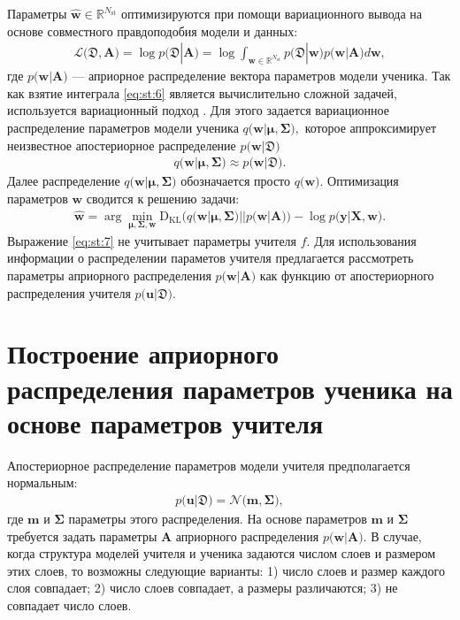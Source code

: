 Параметры $\hat{\mathbf{w}} \in \mathbb{R}^{N_{\text{st}}}$ оптимизируются при помощи вариационного вывода на основе совместного правдоподобия модели и данных:
\[
\label{eq:st:6}
\begin{aligned}
\mathcal{L}\bigr(\mathfrak{D}, \mathbf{A}\bigr) = \log p\bigr(\mathfrak{D}|\mathbf{A}\bigr) = \log \int_{\mathbf{w} \in \mathbb{R}^{N_{\text{st}}}}p\bigr(\mathfrak{D}|\mathbf{w}\bigr)p\bigr(\mathbf{w}|\mathbf{A}\bigr)d\mathbf{w},
\end{aligned}
\]
где $p\bigr(\mathbf{w}| \mathbf{A}\bigr)$ --- априорное распределение вектора параметров модели ученика.
Так как взятие интеграла \eqref{eq:st:6} является вычислительно сложной задачей, используется вариационный подход \cite{graves2011, grabovoy2019}. Для этого задается вариационное распределение параметров модели ученика $q\bigr(\mathbf{w}|\bm{\mu}, \bm{\Sigma}\bigr),$ которое аппроксимирует неизвестное апостериорное распределение $p\bigr(\mathbf{w}|\mathfrak{D}\bigr)$
\[
\label{eq:st:new:1}
\begin{aligned}
q\bigr(\mathbf{w}|\bm{\mu}, \bm{\Sigma}\bigr) \approx  p\bigr(\mathbf{w}|\mathfrak{D}\bigr).
\end{aligned}
\]
Далее распределение $q\bigr(\mathbf{w}|\bm{\mu}, \bm{\Sigma}\bigr)$ обозначается просто $q\bigr(\mathbf{w}\bigr).$ Оптимизация параметров $\mathbf{w}$ сводится к решению  задачи:
\[
\label{eq:st:7}
\begin{aligned}
\hat{\mathbf{w}} = \arg \min_{\bm{\mu}, \bm{\Sigma}, \mathbf{w}} \text{D}_{\text{KL}}\bigr(q\bigr(\mathbf{w}|\bm{\mu}, \bm{\Sigma}\bigr)||p\bigr(\mathbf{w}|\mathbf{A}\bigr)\bigr) - \log p\bigr(\mathbf{y}|\mathbf{X}, \mathbf{w}\bigr).
\end{aligned}
\]
Выражение \eqref{eq:st:7} не учитывает параметры учителя $f$. Для использования информации о распределении параметов учителя предлагается рассмотреть параметры априорного распределения $p\bigr(\mathbf{w}|\mathbf{A}\bigr)$ как функцию от апостериорного распределения учителя $p\bigr(\mathbf{u}|\mathfrak{D}\bigr)$.

\section{Построение априорного распределения параметров ученика на основе параметров учителя}
Апостериорное распределение параметров модели учителя предполагается нормальным:
\[
\label{eq:ap:1}
\begin{aligned}
p\bigr(\mathbf{u}|\mathfrak{D}\bigr) = \mathcal{N}\bigr(\mathbf{m}, \bm{\Sigma}\bigr),
\end{aligned}
\]
где $\mathbf{m}$ и $\bm{\Sigma}$ параметры этого распределения. На основе параметров $\mathbf{m}$ и $\bm{\Sigma}$ требуется задать параметры $\mathbf{A}$ априорного распределения $p\bigr(\mathbf{w}|\mathbf{A}\bigr).$
В случае, когда структура моделей учителя и ученика задаются числом слоев и размером этих слоев, то возможны следующие варианты: 1) число слоев и размер каждого слоя совпадает; 2) число слоев совпадает, а размеры различаются; 3) не совпадает число слоев.

